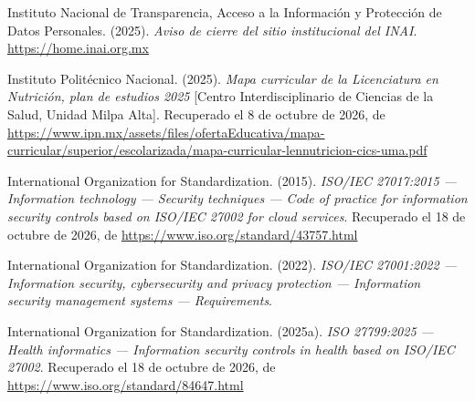 \documentclass[12pt, a4paper]{article}
\begin{document}
\begin{list}{}{\setlength{\leftmargin}{1.27cm}\setlength{\itemindent}{-1.27cm}%
  \setlength{\labelwidth}{0pt}\setlength{\labelsep}{0pt}\setlength{\itemsep}{6pt}}
\item Instituto Nacional de Transparencia, Acceso a la Información
  y Protección de Datos Personales. (2025).
  \textit{Aviso de cierre del sitio institucional del INAI}.
  \url{https://home.inai.org.mx}


\item Instituto Politécnico Nacional. (2025). \textit{Mapa curricular de la
  Licenciatura en Nutrición, plan de estudios 2025} [Centro
  Interdisciplinario de Ciencias de la Salud, Unidad Milpa Alta]. Recuperado el 8 de octubre de 2026, de \url{https://www.ipn.mx/assets/files/ofertaEducativa/mapa-curricular/superior/escolarizada/mapa-curricular-lennutricion-cics-uma.pdf}
 

\item International Organization for Standardization. (2015).
  \textit{ISO/IEC 27017:2015 --- Information technology --- Security
  techniques --- Code of practice for information security controls
  based on ISO/IEC 27002 for cloud services}.
  Recuperado el 18 de octubre de 2026, de \url{https://www.iso.org/standard/43757.html}
 

\item International Organization for Standardization. (2022).
  \textit{ISO/IEC 27001:2022 --- Information security, cybersecurity
  and privacy protection --- Information security management systems
  --- Requirements}.


\item International Organization for Standardization. (2025a).
  \textit{ISO 27799:2025 --- Health informatics --- Information
  security controls in health based on ISO/IEC 27002}.
  Recuperado el 18 de octubre de 2026, de \url{https://www.iso.org/standard/84647.html}
 
 

\end{list}
\end{document}
